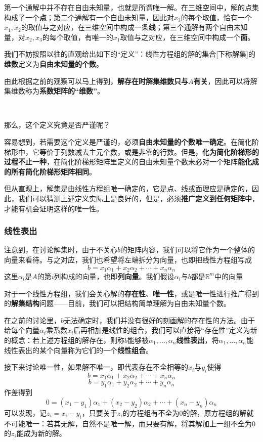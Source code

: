 \documentclass[a4paper,UTF8,fontset=windows]{ctexart}
\begin{document}
第一个通解中并不存在自由未知量，也就是所谓唯一解。在三维空间中，解的点集构成了一个\textbf{点}；第二个通解有一个自由未知量，因此对$x_3$的每个取值，恰有一个$x_1,x_2$的取值与之对应，在三维空间中构成一条\textbf{线}；第三个通解有两个自由未知量，对$x_2,x_3$的每个取值，有唯一的$x_1$取值与之对应，在三维空间中构成一个\textbf{面}。

我们不妨按照以往的直观给出如下的``定义''：线性方程组的解的集合[下称解集]的\textbf{维数}定义为\textbf{自由未知量的个数}。

由此根据之前的观察可以马上得到，\textbf{解存在时解集维数只与$A$有关}，因此可以将解集维数称为\textbf{系数矩阵的``维数''}。

\

那么，这个定义究竟是否严谨呢？

容易想到，若需要这个定义是严谨的，必须\textbf{自由未知量的个数唯一确定}。在简化阶梯形中，它等价于列数减去主元个数，或是非零的行数。但是，\textbf{化为简化阶梯形的过程不止一种}，在简化阶梯形矩阵里定义的自由未知量个数未必对一个矩阵\textbf{能化成的所有简化阶梯形矩阵相同}。

但从直观上，解集是由线性方程组唯一确定的，它是点、线或面理应是确定的，因此，我们可以猜测上述定义实际上是良好的，但是，必须\textbf{推广定义到任何矩阵中}，才能有机会证明这样的唯一性。

\subsubsection{线性表出}
注意到，在讨论解集时，由于不关心$b$的矩阵内容，我们可以将它作为一个整体的向量来看待。与之对应，我们也希望将左端拆分为向量，也即把线性方程组写成
$$b=x_1\alpha_1+x_2\alpha_2+\cdots+x_n\alpha_n$$
这里$\alpha_i$是$A$的第$i$列构成的向量，也即\textbf{列向量}。我们假设$\alpha_i$与$b$都是$\mathbb{R}^m$中的向量

对于一个线性方程组，我们会关心解的\textbf{存在性}、\textbf{唯一性}，或是唯一性进行推广得到的\textbf{解集结构}问题——目前，我们可以把结构简单理解为自由未知量个数。

在之前的讨论里，$b$无法确定时，我们并没有很好的刻画解的存在性的方法。由于给每个向量$\alpha_i$乘系数$x_i$后再相加是线性的组合，我们可以直接将``存在性''定义为新的概念：若上述方程组的解存在，则称$b$能够被$\alpha_1,\dots,\alpha_n$\textbf{线性表出}，将$\alpha_1,\dots,\alpha_n$能线性表出的某个向量称为它们的一个\textbf{线性组合}。

接下来讨论唯一性，如果解不唯一，即代表存在不全相等的$x_i$与$y_i$使得
$$b=x_1\alpha_1+x_2\alpha_2+\cdots+x_n\alpha_n$$
$$b=y_1\alpha_1+y_2\alpha_2+\cdots+y_n\alpha_n$$
作差得到
$$0=(x_1-y_1)\alpha_1+(x_2-y_2)\alpha_2+\cdots+(x_n-y_n)\alpha_n$$
可以发现，记$z_i=x_i-y_i$，只要关于$z_i$的方程组有不全为0的解，原方程组的解就不可能唯一：若其无解，自然不是唯一解，而只要有解，将其解加上一组不全为0的$z_i$能成为新的解。
\end{document}
